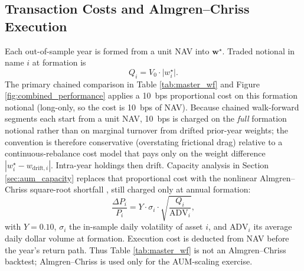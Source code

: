 \documentclass[11pt,a4paper]{article}
\begin{document}
\subsection{Transaction Costs and Almgren--Chriss Execution}
\label{sec:execution_costs}
Each out-of-sample year is formed from a unit NAV into $\mathbf{w}^\star$. Traded notional in name $i$ at formation is
\begin{equation}
Q_{i} = V_0 \cdot \bigl|w^\star_i\bigr|.
\end{equation}
The primary chained comparison in Table \ref{tab:master_wf} and Figure \ref{fig:combined_performance} applies a 10~bps proportional cost on this formation notional (long-only, so the cost is 10~bps of NAV). Because chained walk-forward segments each start from a unit NAV, 10~bps is charged on the \emph{full} formation notional rather than on marginal turnover from drifted prior-year weights; the convention is therefore conservative (overstating frictional drag) relative to a continuous-rebalance cost model that pays only on the weight difference $|w^\star_i - w_{\text{drift},i}|$. Intra-year holdings then drift. Capacity analysis in Section \ref{sec:aum_capacity} replaces that proportional cost with the nonlinear Almgren--Chriss square-root shortfall \cite{almgren2001, horst2024}, still charged only at annual formation:
\begin{equation}
\frac{\Delta P_i}{P_i} = Y \cdot \sigma_i \cdot \sqrt{\frac{Q_{i}}{\text{ADV}_{i}}},
\end{equation}
with $Y = 0.10$, $\sigma_i$ the in-sample daily volatility of asset $i$, and $\text{ADV}_{i}$ its average daily dollar volume at formation. Execution cost is deducted from NAV before the year's return path. Thus Table \ref{tab:master_wf} is not an Almgren--Chriss backtest; Almgren--Chriss is used only for the AUM-scaling exercise.
\end{document}
